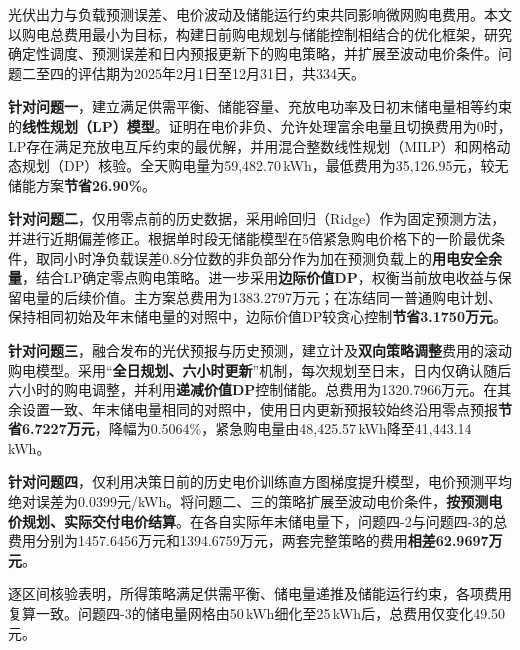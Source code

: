 光伏出力与负载预测误差、电价波动及储能运行约束共同影响微网购电费用。本文以购电总费用最小为目标，构建日前购电规划与储能控制相结合的优化框架，研究确定性调度、预测误差和日内预报更新下的购电策略，并扩展至波动电价条件。问题二至四的评估期为2025年2月1日至12月31日，共334天。

\textbf{针对问题一}，建立满足供需平衡、储能容量、充放电功率及日初末储电量相等约束的\textbf{线性规划（LP）模型}。证明在电价非负、允许处理富余电量且切换费用为0时，LP存在满足充放电互斥约束的最优解，并用混合整数线性规划（MILP）和网格动态规划（DP）核验。全天购电量为59,482.70\,kWh，最低费用为35,126.95元，较无储能方案\textbf{节省26.90\%}。

\textbf{针对问题二}，仅用零点前的历史数据，采用岭回归（Ridge）作为固定预测方法，并进行近期偏差修正。根据单时段无储能模型在5倍紧急购电价格下的一阶最优条件，取同小时净负载误差0.8分位数的非负部分作为加在预测负载上的\textbf{用电安全余量}，结合LP确定零点购电策略。进一步采用\textbf{边际价值DP}，权衡当前放电收益与保留电量的后续价值。主方案总费用为1383.2797万元；在冻结同一普通购电计划、保持相同初始及年末储电量的对照中，边际价值DP较贪心控制\textbf{节省3.1750万元}。

\textbf{针对问题三}，融合发布的光伏预报与历史预测，建立计及\textbf{双向策略调整}费用的滚动购电模型。采用“\textbf{全日规划、六小时更新}”机制，每次规划至日末，日内仅确认随后六小时的购电调整，并利用\textbf{递减价值DP}控制储能。总费用为1320.7966万元。在其余设置一致、年末储电量相同的对照中，使用日内更新预报较始终沿用零点预报\textbf{节省6.7227万元}，降幅为0.5064\%，紧急购电量由48,425.57\,kWh降至41,443.14\,kWh。

\textbf{针对问题四}，仅利用决策日前的历史电价训练直方图梯度提升模型，电价预测平均绝对误差为0.0399元/kWh。将问题二、三的策略扩展至波动电价条件，\textbf{按预测电价规划、实际交付电价结算}。在各自实际年末储电量下，问题四-2与问题四-3的总费用分别为1457.6456万元和1394.6759万元，两套完整策略的费用\textbf{相差62.9697万元}。

逐区间核验表明，所得策略满足供需平衡、储电量递推及储能运行约束，各项费用复算一致。问题四-3的储电量网格由50\,kWh细化至25\,kWh后，总费用仅变化49.50元。
